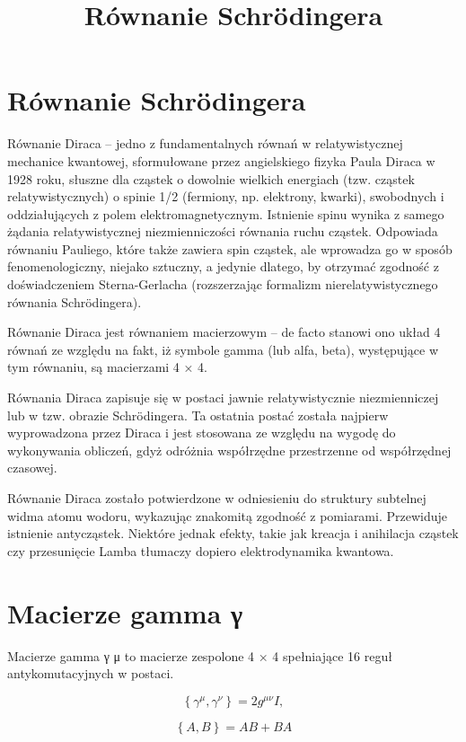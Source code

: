 \documentclass{article}
\begin{document}
\title{Równanie Schrödingera}
\maketitle

\section{Równanie Schrödingera}
Równanie Diraca – jedno z fundamentalnych równań w relatywistycznej mechanice kwantowej, sformułowane przez angielskiego fizyka Paula Diraca w 1928 roku, słuszne dla cząstek o dowolnie wielkich energiach (tzw. cząstek relatywistycznych) o spinie 1/2 (fermiony, np. elektrony, kwarki), swobodnych i oddziałujących z polem elektromagnetycznym. Istnienie spinu wynika z samego żądania relatywistycznej niezmienniczości równania ruchu cząstek. Odpowiada równaniu Pauliego, które także zawiera spin cząstek, ale wprowadza go w sposób fenomenologiczny, niejako sztuczny, a jedynie dlatego, by otrzymać zgodność z doświadczeniem Sterna-Gerlacha (rozszerzając formalizm nierelatywistycznego równania Schrödingera).

Równanie Diraca jest równaniem macierzowym – de facto stanowi ono układ 4 równań ze względu na fakt, iż symbole gamma (lub alfa, beta), występujące w tym równaniu, są macierzami 4 × 4.

Równania Diraca zapisuje się w postaci jawnie relatywistycznie niezmienniczej lub w tzw. obrazie Schrödingera. Ta ostatnia postać została najpierw wyprowadzona przez Diraca i jest stosowana ze względu na wygodę do wykonywania obliczeń, gdyż odróżnia współrzędne przestrzenne od współrzędnej czasowej.

Równanie Diraca zostało potwierdzone w odniesieniu do struktury subtelnej widma atomu wodoru, wykazując znakomitą zgodność z pomiarami. Przewiduje istnienie antycząstek. Niektóre jednak efekty, takie jak kreacja i anihilacja cząstek czy przesunięcie Lamba tłumaczy dopiero elektrodynamika kwantowa. 


\section{Macierze gamma γ }
Macierze gamma γ μ to macierze zespolone 4 × 4 spełniające 16 reguł antykomutacyjnych w postaci.

$${ \left\{\gamma ^{\mu },\gamma ^{\nu }\right\}=2g^{\mu \nu }I,}$$

$${ \left\{A,B\right\}=AB+BA}$$
\end{document}
